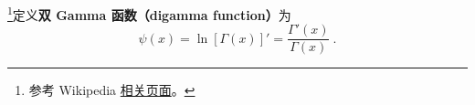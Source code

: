 
\begin{issues}
\issueDraft
\end{issues}


\footnote{参考 Wikipedia \href{https://en.wikipedia.org/wiki/Digamma_function}{相关页面}。}定义\textbf{双 Gamma 函数（digamma function）}为
\begin{equation}
\psi(x) = \ln[\Gamma(x)]' = \frac{\Gamma'(x)}{\Gamma(x)}~.
\end{equation}


